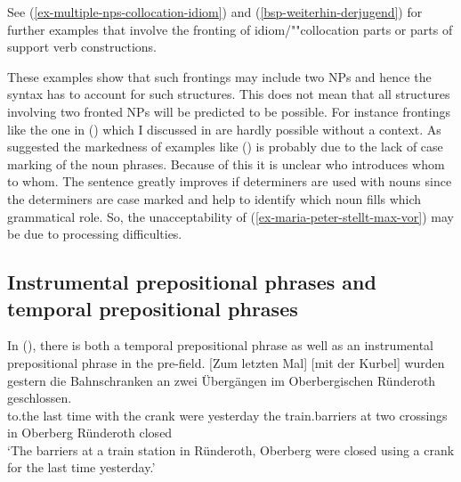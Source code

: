 See (\ref{ex-multiple-nps-collocation-idiom}) and (\ref{bsp-weiterhin-derjugend}) for further examples that involve the
fronting of idiom/""collocation parts or parts of support verb constructions.

These examples show that such frontings may include two NPs and hence the syntax has to account for
such structures. This does not mean that all structures involving two fronted NPs will be predicted
to be possible. For instance frontings like the one in () which I discussed in
 are hardly possible without a context.
\z
As \citet[]{Winkler2014a} suggested the markedness of examples like () is probably
due to the lack of case marking of the noun phrases. Because of this it is unclear who
introduces whom to whom. The sentence greatly improves if determiners are used with nouns since the
determiners are case marked and help to identify which noun fills which grammatical role.
\eal
{}
\zl
So, the unacceptability of (\ref{ex-maria-peter-stellt-max-vor}) may be due to processing
difficulties.


\subsection{Instrumental prepositional phrases and temporal prepositional phrases}

In (), there is both a temporal prepositional phrase as well as an instrumental prepositional phrase 
in the pre-field.
\ea
\label{bsp-instrument}
\gll {}[Zum letzten Mal] [mit der Kurbel] wurden gestern die Bahnschranken an zwei Übergängen im Oberbergischen Ründeroth geschlossen.\footnotemark\\
	 \spacebr{}to.the last time \spacebr{}with the crank were yesterday the train.barriers at two crossings in Oberberg Ründeroth closed\\
\glt `The barriers at a train station in Ründeroth, Oberberg were closed using a crank for the last time yesterday.'
\z

